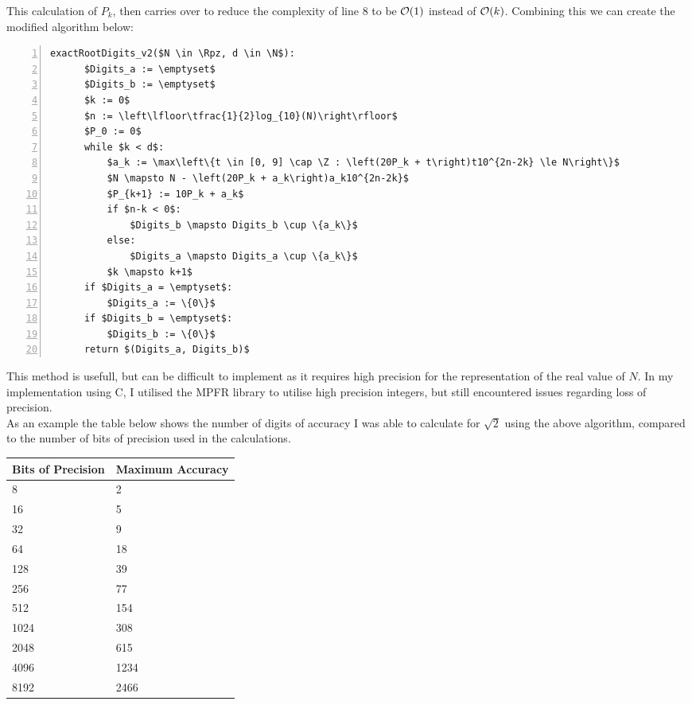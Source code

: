 This calculation of \(P_k\), then carries over to reduce the complexity of line 8 to be \(\mathcal{O}(1)\) instead of \(\mathcal{O}(k)\). Combining this we can create the modified algorithm below:

\begin{lstlisting}[numbers=left,frame=single,mathescape,caption={Exact Digit by Digits Square Root version 2}]
  exactRootDigits_v2($N \in \Rpz, d \in \N$):
      $Digits_a := \emptyset$
      $Digits_b := \emptyset$
      $k := 0$
      $n := \left\lfloor\tfrac{1}{2}log_{10}(N)\right\rfloor$
      $P_0 := 0$
      while $k < d$:
          $a_k := \max\left\{t \in [0, 9] \cap \Z : \left(20P_k + t\right)t10^{2n-2k} \le N\right\}$
          $N \mapsto N - \left(20P_k + a_k\right)a_k10^{2n-2k}$
          $P_{k+1} := 10P_k + a_k$
          if $n-k < 0$:
              $Digits_b \mapsto Digits_b \cup \{a_k\}$
          else:
              $Digits_a \mapsto Digits_a \cup \{a_k\}$
          $k \mapsto k+1$
      if $Digits_a = \emptyset$:
          $Digits_a := \{0\}$
      if $Digits_b = \emptyset$:
          $Digits_b := \{0\}$
      return $(Digits_a, Digits_b)$
\end{lstlisting}

This method is usefull, but can be difficult to implement as it requires high precision for the representation of the real value of \(N\). In my implementation using C, I utilised the MPFR library to utilise high precision integers, but still encountered issues regarding loss of precision.\\

As an example the table below shows the number of digits of accuracy I was able to calculate for \(\sqrt{2}\) using the above algorithm, compared to the number of bits of precision used in the calculations.\\

\begin{center}
\begin{tabular}{|p{3cm}|p{3cm}|}
\hline
Bits of Precision & Maximum Accuracy\\ \hline
8 & 2 \\ \hline
16 & 5 \\ \hline
32 & 9 \\ \hline
64 & 18 \\ \hline
128 & 39 \\ \hline
256 & 77 \\ \hline
512 & 154 \\ \hline
1024 & 308 \\ \hline
2048 & 615 \\ \hline
4096 & 1234 \\ \hline
8192 & 2466 \\ \hline
\end{tabular}
\end{center}

